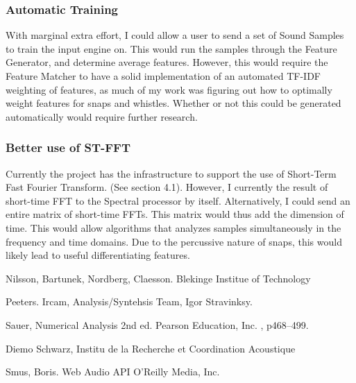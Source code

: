\documentclass[DIV=calc, paper=a4, fontsize=11pt, twocolumn]{scrartcl}   %
\begin{document}
   \subsubsection{Automatic Training}
   With marginal extra effort, I could allow a user to send a set of Sound Samples to train the input engine on. This would run the samples through the Feature Generator, and determine average features. However, this would require the Feature Matcher to have a solid implementation of an automated TF-IDF weighting of features, as much of my work was figuring out how to optimally weight features for snaps and whistles. Whether or not this could be generated automatically would require further research.
   \subsubsection{Better use of ST-FFT}
   Currently the project has the infrastructure to support the use of Short-Term Fast Fourier Transform. (See section 4.1). However, I currently the result  of short-time FFT to the Spectral processor by itself. Alternatively, I could send an entire matrix of short-time FFTs. This matrix would thus add the dimension of time. This would allow algorithms that analyzes samples simultaneously in the frequency and time domains. Due to the percussive nature of snaps, this would likely lead to useful differentiating features.


\begin{thebibliography}{99} %


Nilsson, Bartunek, Nordberg, Claesson. Blekinge Institue of Technology

Peeters. Ircam, Analysis/Syntehsis Team, Igor Stravinksy.

Sauer, Numerical Analysis 2nd ed. Pearson Education, Inc.
, p468--499.

Diemo Schwarz, Institu de la Recherche et Coordination Acoustique

Smus, Boris. Web Audio API O'Reilly Media, Inc.


\end{thebibliography}

\end{document}
